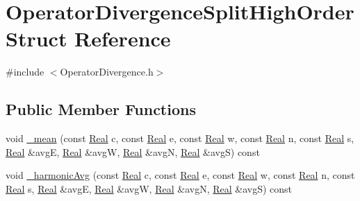 \hypertarget{struct_operator_divergence_split_high_order}{}\section{Operator\+Divergence\+Split\+High\+Order Struct Reference}
\label{struct_operator_divergence_split_high_order}


{\ttfamily \#include $<$Operator\+Divergence.\+h$>$}

\subsection*{Public Member Functions}
\begin{DoxyCompactItemize}
\item 
void \hyperlink{struct_operator_divergence_split_high_order_ae7622c3be06fe1e484b8650fe126d940}{\+\_\+mean} (const \hyperlink{_h_d_f5_dumper_8h_a445a5f0e2a34c9d97d69a3c2d1957907}{Real} c, const \hyperlink{_h_d_f5_dumper_8h_a445a5f0e2a34c9d97d69a3c2d1957907}{Real} e, const \hyperlink{_h_d_f5_dumper_8h_a445a5f0e2a34c9d97d69a3c2d1957907}{Real} w, const \hyperlink{_h_d_f5_dumper_8h_a445a5f0e2a34c9d97d69a3c2d1957907}{Real} n, const \hyperlink{_h_d_f5_dumper_8h_a445a5f0e2a34c9d97d69a3c2d1957907}{Real} s, \hyperlink{_h_d_f5_dumper_8h_a445a5f0e2a34c9d97d69a3c2d1957907}{Real} \&avg\+E, \hyperlink{_h_d_f5_dumper_8h_a445a5f0e2a34c9d97d69a3c2d1957907}{Real} \&avg\+W, \hyperlink{_h_d_f5_dumper_8h_a445a5f0e2a34c9d97d69a3c2d1957907}{Real} \&avg\+N, \hyperlink{_h_d_f5_dumper_8h_a445a5f0e2a34c9d97d69a3c2d1957907}{Real} \&avg\+S) const 
\item 
void \hyperlink{struct_operator_divergence_split_high_order_a3b424419c1a002fed0ef9f74da3ce809}{\+\_\+harmonic\+Avg} (const \hyperlink{_h_d_f5_dumper_8h_a445a5f0e2a34c9d97d69a3c2d1957907}{Real} c, const \hyperlink{_h_d_f5_dumper_8h_a445a5f0e2a34c9d97d69a3c2d1957907}{Real} e, const \hyperlink{_h_d_f5_dumper_8h_a445a5f0e2a34c9d97d69a3c2d1957907}{Real} w, const \hyperlink{_h_d_f5_dumper_8h_a445a5f0e2a34c9d97d69a3c2d1957907}{Real} n, const \hyperlink{_h_d_f5_dumper_8h_a445a5f0e2a34c9d97d69a3c2d1957907}{Real} s, \hyperlink{_h_d_f5_dumper_8h_a445a5f0e2a34c9d97d69a3c2d1957907}{Real} \&avg\+E, \hyperlink{_h_d_f5_dumper_8h_a445a5f0e2a34c9d97d69a3c2d1957907}{Real} \&avg\+W, \hyperlink{_h_d_f5_dumper_8h_a445a5f0e2a34c9d97d69a3c2d1957907}{Real} \&avg\+N, \hyperlink{_h_d_f5_dumper_8h_a445a5f0e2a34c9d97d69a3c2d1957907}{Real} \&avg\+S) const 
\item 

\end{DoxyCompactItemize}
